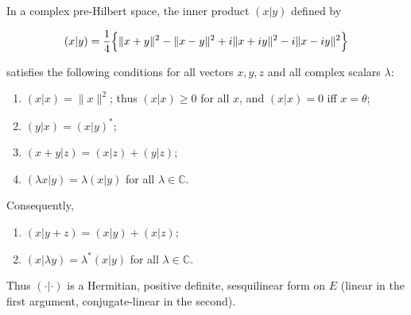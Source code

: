In a complex pre-Hilbert space, the inner product $(x|y)$ defined by

$$(x|y) = \frac{1}{4}\Bigl\{\|x + y\|^2 - \|x - y\|^2 + i\|x + iy\|^2 - i\|x - iy\|^2\Bigr\}$$

satisfies the following conditions for all vectors $x, y, z$ and all complex scalars $\lambda$:

\begin{enumerate}
\item[(i)] $(x|x) = \|x\|^2$; thus $(x|x) \geq 0$ for all $x$, and $(x|x) = 0$ iff $x = \theta$;
\item[(ii)] $(y|x) = (x|y)^*$;
\item[(iii)] $(x + y|z) = (x|z) + (y|z)$;
\item[(iv)] $(\lambda x|y) = \lambda(x|y)$ for all $\lambda \in \mathbb{C}$.
\end{enumerate}

Consequently,

\begin{enumerate}
\item[(v)] $(x|y + z) = (x|y) + (x|z)$;
\item[(vi)] $(x|\lambda y) = \lambda^*(x|y)$ for all $\lambda \in \mathbb{C}$.
\end{enumerate}

Thus $(\cdot|\cdot)$ is a Hermitian, positive definite, sesquilinear form on $E$ (linear in the first argument, conjugate-linear in the second).
